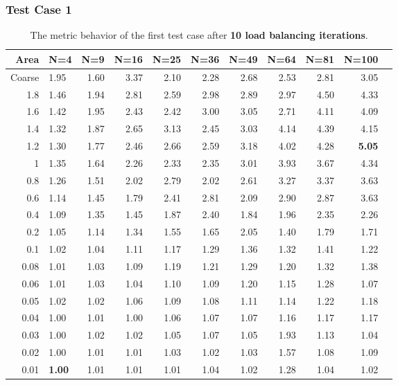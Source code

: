 \documentclass[compress]{beamer}
\begin{document}
\begin{frame}[t]\frametitle{Test Case 1}
\begin{table}[H]
\tiny
\centering
\caption{The metric behavior of the first test case after \textbf{10 load balancing iterations}.} 
\begin{tabular}{rlrrrrrrrrr}
  \hline
 Area & N=4 & N=9 & N=16 & N=25 & N=36 & N=49 & N=64 & N=81 & N=100 \\ 
  \hline
 Coarse & 1.95 & 1.60 & 3.37 & 2.10 & 2.28 & 2.68 & 2.53 & 2.81 & 3.05 \\ 
 1.8 & 1.46 & 1.94 & 2.81 & 2.59 & 2.98 & 2.89 & 2.97 & 4.50 & 4.33 \\ 
 1.6 & 1.42 & 1.95 & 2.43 & 2.42 & 3.00 & 3.05 & 2.71 & 4.11 & 4.09 \\ 
1.4 & 1.32 & 1.87 & 2.65 & 3.13 & 2.45 & 3.03 & 4.14 & 4.39 & 4.15 \\ 
 1.2 & 1.30 & 1.77 & 2.46 & 2.66 & 2.59 & 3.18 & 4.02 & 4.28 & \textbf{\cellcolor{blue!25}5.05} \\ 
  1 & 1.35 & 1.64 & 2.26 & 2.33 & 2.35 & 3.01 & 3.93 & 3.67 & 4.34 \\ 
 0.8 & 1.26 & 1.51 & 2.02 & 2.79 & 2.02 & 2.61 & 3.27 & 3.37 & 3.63 \\ 
 0.6 & 1.14 & 1.45 & 1.79 & 2.41 & 2.81 & 2.09 & 2.90 & 2.87 & 3.63 \\ 
   0.4 & 1.09 & 1.35 & 1.45 & 1.87 & 2.40 & 1.84 & 1.96 & 2.35 & 2.26 \\ 
   0.2 & 1.05 & 1.14 & 1.34 & 1.55 & 1.65 & 2.05 & 1.40 & 1.79 & 1.71 \\ 
  0.1 & 1.02 & 1.04 & 1.11 & 1.17 & 1.29 & 1.36 & 1.32 & 1.41 & 1.22 \\ 
  0.08 & 1.01 & 1.03 & 1.09 & 1.19 & 1.21 & 1.29 & 1.20 & 1.32 & 1.38 \\ 
   0.06 & 1.01 & 1.03 & 1.04 & 1.10 & 1.09 & 1.20 & 1.15 & 1.28 & 1.07 \\ 
   0.05 & 1.02 & 1.02 & 1.06 & 1.09 & 1.08 & 1.11 & 1.14 & 1.22 & 1.18 \\ 
   0.04 & 1.00 & 1.01 & 1.00 & 1.06 & 1.07 & 1.07 & 1.16 & 1.17 & 1.17 \\ 
   0.03 & 1.00 & 1.02 & 1.02 & 1.05 & 1.07 & 1.05 & 1.93 & 1.13 & 1.04 \\ 
   0.02 & 1.00 & 1.01 & 1.01 & 1.03 & 1.02 & 1.03 & 1.57 & 1.08 & 1.09 \\ 
   0.01 & \textbf{\cellcolor{blue!25}1.00} & 1.01 & 1.01 & 1.01 & 1.04 & 1.02 & 1.28 & 1.04 & 1.02 \\ 
   \hline
\end{tabular}
\end{table}
\end{frame}
\end{document}
